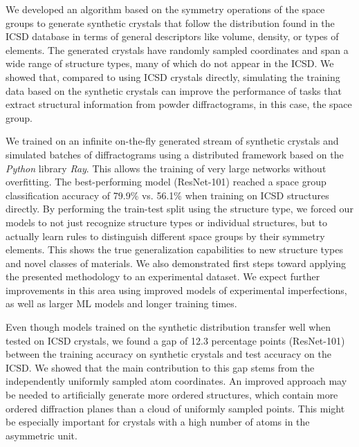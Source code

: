 We developed an algorithm based on the symmetry operations of the space groups
to generate synthetic crystals that follow the distribution found in the ICSD
database in terms of general descriptors like volume, density, or types of
elements. The generated crystals have randomly sampled coordinates and span a
wide range of structure types, many of which do not appear in the ICSD. We
showed that, compared to using ICSD crystals directly, simulating the training
data based on the synthetic crystals can improve the performance of tasks that
extract structural information from powder diffractograms, in this case, the
space group. 

We trained on an infinite on-the-fly generated stream of synthetic crystals and simulated
batches of diffractograms using a distributed framework based on the
\emph{Python} library \emph{Ray}\supercite{moritzRayDistributedFramework2018a}.
This allows the training of very large networks without overfitting. The
best-performing model (ResNet-101) reached a space group classification accuracy
of 79.9\% vs. 56.1\% when training on ICSD structures directly. By performing
the train-test split using the structure type, we forced our models to not just
recognize structure types or individual structures, but to actually learn rules
to distinguish different space groups by their symmetry elements. This shows the
true generalization capabilities to new structure types and novel classes of
materials. We also demonstrated first steps toward applying the presented methodology to an experimental dataset. We expect further improvements in this area using improved models of experimental imperfections, as well as larger ML models and longer training times.

Even though models trained on the synthetic distribution transfer well when
tested on ICSD crystals, we found a gap of 12.3 percentage points (ResNet-101)
between the training accuracy on synthetic crystals and test accuracy on the
ICSD. We showed that the main contribution to this gap stems from the
independently uniformly sampled atom coordinates. An improved approach may be
needed to artificially generate more ordered structures, which contain more
ordered diffraction planes than a cloud of uniformly sampled points. This might
be especially important for crystals with a high number of atoms in the
asymmetric unit.

